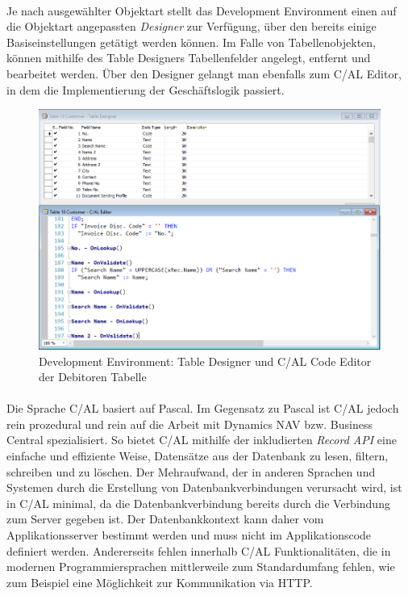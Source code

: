 \paragraph{}
Je nach ausgewählter Objektart stellt das Development Environment einen auf die Objektart angepassten \textit{Designer} zur Verfügung, über den bereits einige Basiseinstellungen getätigt werden können. Im Falle von Tabellenobjekten, können mithilfe des Table Designers Tabellenfelder angelegt, entfernt und bearbeitet werden. Über den Designer gelangt man ebenfalls zum C/AL Editor, in dem die Implementierung der Geschäftslogik passiert.

\begin{figure}[h]
	\centering
	\includegraphics[width=130mm]{images/TableDesigner}
	\caption{Development Environment: Table Designer und C/AL Code Editor der Debitoren Tabelle}
	\label{fig:TableDesignerCodeEditor}
\end{figure}

\paragraph{}
Die Sprache C/AL basiert auf Pascal. Im Gegensatz zu Pascal ist C/AL jedoch rein prozedural und rein auf die Arbeit mit Dynamics NAV bzw. Business Central spezialisiert. So bietet C/AL mithilfe der inkludierten \textit{Record API} eine einfache und effiziente Weise, Datensätze aus der Datenbank zu lesen, filtern, schreiben und zu löschen. Der Mehraufwand, der in anderen Sprachen und Systemen durch die Erstellung von Datenbankverbindungen verursacht wird, ist in C/AL minimal, da die Datenbankverbindung bereits durch die Verbindung zum Server gegeben ist. Der Datenbankkontext kann daher vom Applikationsserver bestimmt werden und muss nicht im Applikationscode definiert werden. Andererseits fehlen innerhalb C/AL Funktionalitäten, die in modernen Programmiersprachen mittlerweile zum Standardumfang fehlen, wie zum Beispiel eine Möglichkeit zur Kommunikation via HTTP.

